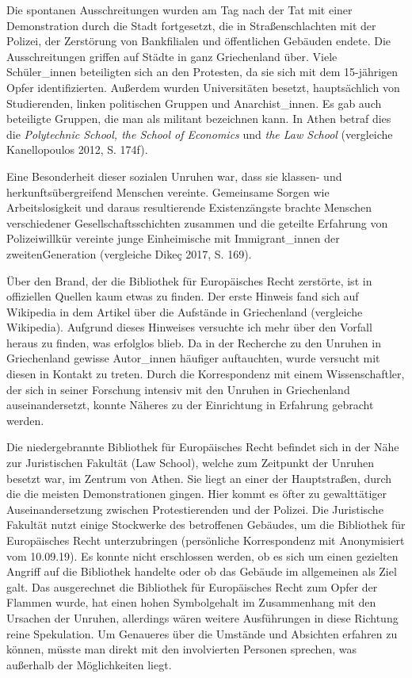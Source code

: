 \documentclass[a4paper,
fontsize=11pt,
oneside,
numbers=noperiodatend,
parskip=half-,
bibliography=totoc,
final
]{scrartcl}
\begin{document}
Die spontanen Ausschreitungen wurden am Tag nach der Tat mit einer
Demonstration durch die Stadt fortgesetzt, die in Straßenschlachten mit
der Polizei, der Zerstörung von Bankfilialen und öffentlichen Gebäuden
endete. Die Ausschreitungen griffen auf Städte in ganz Griechenland
über. Viele Schüler\_innen beteiligten sich an den Protesten, da sie
sich mit dem 15-jährigen Opfer identifizierten. Außerdem wurden
Universitäten besetzt, hauptsächlich von Studierenden, linken
politischen Gruppen und Anarchist\_innen. Es gab auch beteiligte
Gruppen, die man als militant bezeichnen kann. In Athen betraf dies die
\emph{Polytechnic School, the School of Economics} und \emph{the Law
School} (vergleiche Kanellopoulos 2012, S. 174f).

Eine Besonderheit dieser sozialen Unruhen war, dass sie klassen- und
herkunftsübergreifend Menschen vereinte. Gemeinsame Sorgen wie
Arbeitslosigkeit und daraus resultierende Existenzängste brachte
Menschen verschiedener Gesellschaftsschichten zusammen und die geteilte
Erfahrung von Polizeiwillkür vereinte junge Einheimische mit
Immigrant\_innen der zweitenGeneration (vergleiche Dikeç 2017, S. 169).

Über den Brand, der die Bibliothek für Europäisches Recht zerstörte, ist
in offiziellen Quellen kaum etwas zu finden. Der erste Hinweis fand sich
auf Wikipedia in dem Artikel über die Aufstände in Griechenland
(vergleiche Wikipedia). Aufgrund dieses Hinweises versuchte ich mehr
über den Vorfall heraus zu finden, was erfolglos blieb. Da in der
Recherche zu den Unruhen in Griechenland gewisse Autor\_innen häufiger
auftauchten, wurde versucht mit diesen in Kontakt zu treten. Durch die
Korrespondenz mit einem Wissenschaftler, der sich in seiner Forschung
intensiv mit den Unruhen in Griechenland auseinandersetzt, konnte
Näheres zu der Einrichtung in Erfahrung gebracht werden.

Die niedergebrannte Bibliothek für Europäisches Recht befindet sich in
der Nähe zur Juristischen Fakultät (Law School), welche zum Zeitpunkt
der Unruhen besetzt war, im Zentrum von Athen. Sie liegt an einer der
Hauptstraßen, durch die die meisten Demonstrationen gingen. Hier kommt
es öfter zu gewalttätiger Auseinandersetzung zwischen Protestierenden
und der Polizei. Die Juristische Fakultät nutzt einige Stockwerke des
betroffenen Gebäudes, um die Bibliothek für Europäisches Recht
unterzubringen (persönliche Korrespondenz mit Anonymisiert vom
10.09.19). Es konnte nicht erschlossen werden, ob es sich um einen
gezielten Angriff auf die Bibliothek handelte oder ob das Gebäude im
allgemeinen als Ziel galt. Das ausgerechnet die Bibliothek für
Europäisches Recht zum Opfer der Flammen wurde, hat einen hohen
Symbolgehalt im Zusammenhang mit den Ursachen der Unruhen, allerdings
wären weitere Ausführungen in diese Richtung reine Spekulation. Um
Genaueres über die Umstände und Absichten erfahren zu können, müsste man
direkt mit den involvierten Personen sprechen, was außerhalb der
Möglichkeiten liegt.
\end{document}
